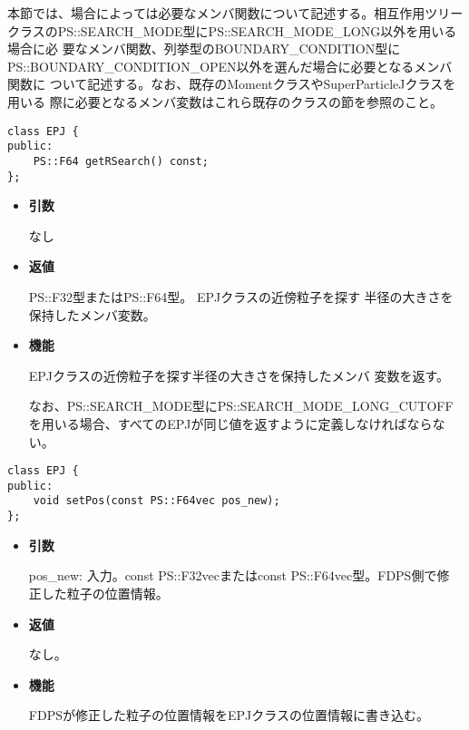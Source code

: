 
本節では、場合によっては必要なメンバ関数について記述する。相互作用ツリー
クラスのPS::SEARCH\_MODE型にPS::SEARCH\_MODE\_LONG以外を用いる場合に必
要なメンバ関数、列挙型のBOUNDARY\_CONDITION型に
PS::BOUNDARY\_CONDITION\_OPEN以外を選んだ場合に必要となるメンバ関数に
ついて記述する。なお、既存のMomentクラスやSuperParticleJクラスを用いる
際に必要となるメンバ変数はこれら既存のクラスの節を参照のこと。



\begin{screen}
\begin{verbatim}
class EPJ {
public:
    PS::F64 getRSearch() const;
};
\end{verbatim}
\end{screen}

\begin{itemize}

\item {\bf 引数}

  なし
  
\item {\bf 返値}

  PS::F32型またはPS::F64型。 EPJクラスの近傍粒子を探す
  半径の大きさを保持したメンバ変数。
  
\item {\bf 機能}

  EPJクラスの近傍粒子を探す半径の大きさを保持したメンバ
  変数を返す。
  
  なお、PS::SEARCH\_MODE型にPS::SEARCH\_MODE\_LONG\_CUTOFFを用いる場合、すべてのEPJが同じ値を返すように定義しなければならない。


\end{itemize}



\begin{screen}
\begin{verbatim}
class EPJ {
public:
    void setPos(const PS::F64vec pos_new);
};
\end{verbatim}
\end{screen}

\begin{itemize}

\item {\bf 引数}

  pos\_new: 入力。const PS::F32vecまたはconst PS::F64vec型。FDPS側で修
  正した粒子の位置情報。

\item {\bf 返値}

  なし。
  
\item {\bf 機能}

  FDPSが修正した粒子の位置情報をEPJクラスの位置情報に書き込む。

\end{itemize}


